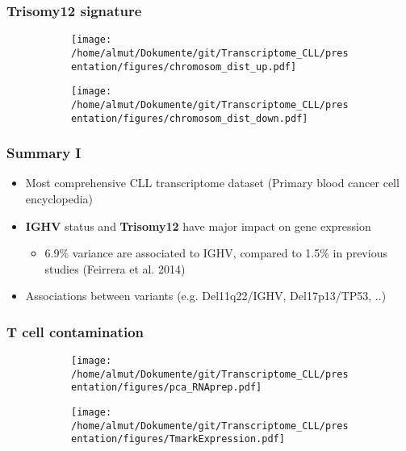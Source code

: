 \documentclass[xcolor=dvipsnames,t,10pt]{beamer}
\begin{document}
%
%
\begin{frame}[c]
	\frametitle{Trisomy12 signature}
	\begin{figure}
		\centering
		\begin{subfigure}[t]{0.45\columnwidth}
			\texttt{[image: /home/almut/Dokumente/git/Transcriptome\_CLL/presentation/figures/chromosom\_dist\_up.pdf]}
		\end{subfigure}
		\hfill
		\begin{subfigure}[t]{0.45\columnwidth}
			\texttt{[image: /home/almut/Dokumente/git/Transcriptome\_CLL/presentation/figures/chromosom\_dist\_down.pdf]}
		\end{subfigure}
	\end{figure}
\end{frame}
%
\begin{frame}[c]
	\frametitle{Summary I}	
	\begin{itemize}
		\item Most comprehensive CLL transcriptome dataset (Primary blood cancer cell encyclopedia)
		\item \textbf{IGHV} status and \textbf{Trisomy12} have major impact on gene expression
		\begin{itemize}
			\item 6.9\% variance are associated to IGHV, compared to 1.5\% in previous studies (Feirrera et al. 2014)
		\end{itemize}
		\item Associations between variants (e.g. Del11q22/IGHV, Del17p13/TP53, ..)
	\end{itemize}
\end{frame}
%
%
\begin{frame}[c]
\frametitle{T cell contamination}
		\begin{figure}
			\centering
			\begin{subfigure}[t]{0.5\columnwidth}
				\texttt{[image: /home/almut/Dokumente/git/Transcriptome\_CLL/presentation/figures/pca\_RNAprep.pdf]}
			\end{subfigure}
			\hfill
			\begin{subfigure}[t]{0.5\columnwidth}
				\texttt{[image: /home/almut/Dokumente/git/Transcriptome\_CLL/presentation/figures/TmarkExpression.pdf]}
			\end{subfigure}
		\end{figure}
\end{frame}
%
%
\end{document}
